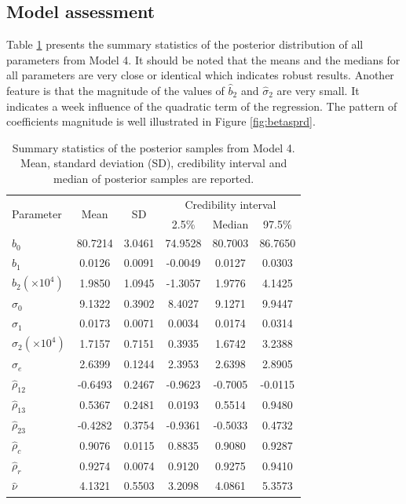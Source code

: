 \documentclass[a4paper]{article}   	%
\begin{document}
	
	\subsection{Model assessment}
	Table \ref{tb:resultModel4} presents the summary statistics of the posterior distribution of all parameters from Model 4. It should be noted that the means and the medians for all parameters are very close or identical which indicates robust results. Another feature is that the magnitude of the values of $\hat{b}_2$ and $\hat{\sigma}_2$ are very small. It indicates a week influence of the quadratic term of the regression. The pattern of coefficients magnitude is well illustrated in Figure \ref{fig:betasprd}.
	
	\begin{table}[!htp]\centering
		\begin{tabular}{ l *{5}{c}} \toprule
			\multirow{2}{*}[-2pt]{Parameter}  &  \multirow{2}{*}[-2pt]{Mean}   & \multirow{2}{*}[-2pt]{SD}  &   \multicolumn{3}{c}{Credibility interval}  \\  \cmidrule{4-6} 
			&     &    &    2.5\%   &       Median  &      97.5\% \\ \midrule 
			$\hat{b}_0$   &  80.7214 &  3.0461 & 74.9528 & 80.7003& 86.7650    \\
			$\hat{b}_1$   &  0.0126 &   0.0091 &  -0.0049 &   0.0127 &  0.0303 \\
			$\hat{b}_2(\times 10^{4})$   & 1.9850 & 1.0945 & -1.3057 & 1.9776   &4.1425  \\
			$\hat{\sigma}_0$&  9.1322 & 0.3902  & 8.4027  & 9.1271  & 9.9447   \\
			$\hat{\sigma}_1$&  0.0173  & 0.0071  & 0.0034  & 0.0174  &  0.0314   \\
			$\hat{\sigma}_2(\times 10^{4})$&   1.7157  & 0.7151  & 0.3935  & 1.6742  & 3.2388   \\		
			$\hat{\sigma}_e$& 2.6399  & 0.1244  & 2.3953  & 2.6398  & 2.8905   \\
			$\hat{\rho}_{12}$& -0.6493 & 0.2467 & -0.9623 & -0.7005 & -0.0115 \\
			$\hat{\rho}_{13}$& 0.5367 & 0.2481 & 0.0193 & 0.5514 & 0.9480   \\
			$\hat{\rho}_{23}$&-0.4282 &  0.3754 & -0.9361 & -0.5033 &  0.4732  \\		
			$\hat{\rho}_c$   & 0.9076 & 0.0115 & 0.8835 & 0.9080 & 0.9287   \\
			$\hat{\rho}_r$   &  0.9274 & 0.0074&  0.9120& 0.9275 & 0.9410  \\
			$\hat{\nu}$ &  4.1321 & 0.5503 & 3.2098 & 4.0861 & 5.3573  \\
			\bottomrule
		\end{tabular}\caption{Summary statistics of the posterior samples from Model 4. Mean, standard deviation (SD), credibility interval and median of posterior samples are reported. }\label{tb:resultModel4}
	\end{table}         
	
\end{document}
